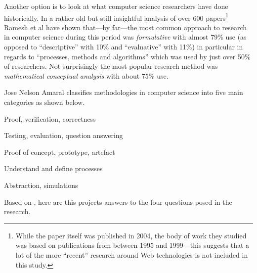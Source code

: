 Another option is to look at what computer science researchers have done historically. In a rather old but still insightful analysis of over \num{600} papers\footnote{While the paper itself was published in 2004, the body of work they studied was based on publications from between 1995 and 1999---this suggests that a lot of the more ``recent'' research around Web technologies is not included in this study.} Ramesh et al \autocite*{Ramesh2004} have shown that---by far---the most common approach to research in computer science during this period was \emph{formulative} with almost 79\% use (as opposed to ``descriptive'' with 10\% and ``evaluative'' with 11\%) in particular in regards to ``processes, methods and algorithms'' which was used by just over 50\% of researchers. Not surprisingly the most popular research method was \emph{mathematical conceptual analysis} with about 75\% use.

Jose Nelson Amaral \autocite*{Amaral2006} classifies methodologies in computer science into five main categories as shown below.

\begin{description}[leftmargin=3.5cm]
  \item [Formal] Proof, verification, correctness
  \item [Experimental] Testing, evaluation, question answering
  \item [Build] Proof of concept, prototype, artefact
  \item [Process] Understand and define processes
  \item [Model] Abstraction, simulations
\end{description}

\spirals

Based on \autocite{Holz2006}, here are this projects answers to the four questions posed in the research.

